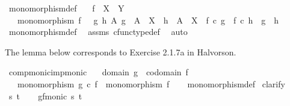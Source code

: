 \begin{isabellebody}
\endisatagproof
{\isafoldproof}%
%
\isadelimproof
\isanewline
%
\endisadelimproof
\isanewline
{}\isamarkupfalse%
\ monomorphism{\isacharunderscore}{\kern0pt}def{}{\isacharcolon}{\kern0pt}\isanewline
\ \ \ {\isachardoublequoteopen}f\ {\isacharcolon}{\kern0pt}\ X\ {\isasymrightarrow}\ Y{\isachardoublequoteclose}\isanewline
\ \ \ {\isachardoublequoteopen}monomorphism\ f\ {\isasymlongleftrightarrow}\ {\isacharparenleft}{\kern0pt}{\isasymforall}\ g\ h\ A{\isachardot}{\kern0pt}\ g\ {\isacharcolon}{\kern0pt}\ A\ {\isasymrightarrow}\ X\ {\isasymand}\ h\ {\isacharcolon}{\kern0pt}\ A\ {\isasymrightarrow}\ X\ {\isasymlongrightarrow}\ {\isacharparenleft}{\kern0pt}f\ {\isasymcirc}\isactrlsub c\ g\ {\isacharequal}{\kern0pt}\ f\ {\isasymcirc}\isactrlsub c\ h\ {\isasymlongrightarrow}\ g\ {\isacharequal}{\kern0pt}\ h{\isacharparenright}{\kern0pt}{\isacharparenright}{\kern0pt}{\isachardoublequoteclose}\isanewline
%
\isadelimproof
\ \ %
\endisadelimproof
%
\isatagproof
{}\isamarkupfalse%
\ monomorphism{\isacharunderscore}{\kern0pt}def{}\ \isamarkupfalse%
\ assms\ cfunc{\isacharunderscore}{\kern0pt}type{\isacharunderscore}{\kern0pt}def\ \isamarkupfalse%
\ auto%
\endisatagproof
{\isafoldproof}%
%
\isadelimproof
%
\endisadelimproof
%
\begin{isamarkuptext}%
The lemma below corresponds to Exercise 2.1.7a in Halvorson.%
\end{isamarkuptext}\isamarkuptrue%
\isamarkupfalse%
\ comp{\isacharunderscore}{\kern0pt}monic{\isacharunderscore}{\kern0pt}imp{\isacharunderscore}{\kern0pt}monic{\isacharcolon}{\kern0pt}\isanewline
\ \ \ {\isachardoublequoteopen}domain\ g\ {\isacharequal}{\kern0pt}\ codomain\ f{\isachardoublequoteclose}\isanewline
\ \ \ {\isachardoublequoteopen}monomorphism\ {\isacharparenleft}{\kern0pt}g\ {\isasymcirc}\isactrlsub c\ f{\isacharparenright}{\kern0pt}\ {\isasymLongrightarrow}\ monomorphism\ f{\isachardoublequoteclose}\isanewline
%
\isadelimproof
\ \ %
\endisadelimproof
%
\isatagproof
{}\isamarkupfalse%
\ monomorphism{\isacharunderscore}{\kern0pt}def\isanewline
{}\isamarkupfalse%
\ clarify\isanewline
\ \ \isamarkupfalse%
\ s\ t\isanewline
\ \ \isamarkupfalse%
\ gf{\isacharunderscore}{\kern0pt}monic{\isacharcolon}{\kern0pt}\ {\isachardoublequoteopen}{\isasymforall}s{\isachardot}{\kern0pt}\ {\isasymforall}t{\isachardot}{\kern0pt}\ \isanewline

\end{isabellebody}
